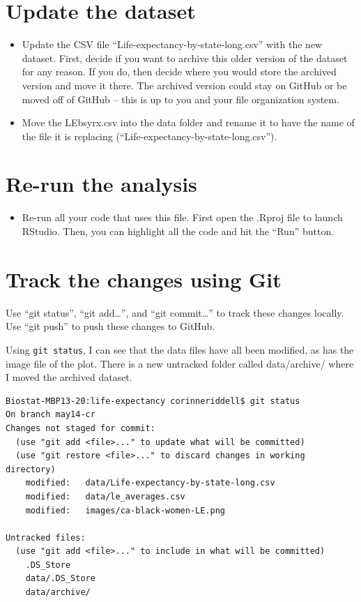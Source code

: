 \documentclass[
]{book}
\providecommand{\tightlist}{%
  \setlength{\itemsep}{0pt}\setlength{\parskip}{0pt}}
\begin{document}
\hypertarget{update-the-dataset}{%
\section{Update the dataset}\label{update-the-dataset}}

\begin{itemize}
\item
  Update the CSV file ``Life-expectancy-by-state-long.csv'' with the new dataset.
  First, decide if you want to archive this older version of the dataset for any reason.
  If you do, then decide where you would store the archived version and move it there.
  The archived version could stay on GitHub or be moved off of GitHub -- this is
  up to you and your file organization system.
\item
  Move the LEbsyrx.csv into the data folder and rename it to have the name of
  the file it is replacing (``Life-expectancy-by-state-long.csv'').
\end{itemize}

\hypertarget{re-run-the-analysis}{%
\section{Re-run the analysis}\label{re-run-the-analysis}}

\begin{itemize}
\tightlist
\item
  Re-run all your code that uses this file. First open the .Rproj file to launch
  RStudio. Then, you can highlight all the code and hit the ``Run'' button.
\end{itemize}

\hypertarget{track-the-changes-using-git}{%
\section{Track the changes using Git}\label{track-the-changes-using-git}}

Use ``git status'', ``git add\ldots{}'', and ``git commit\ldots{}'' to track these changes
locally. Use ``git push'' to push these changes to GitHub.

Using \texttt{git\ status}, I can see that the data files have all been modified, as has
the image file of the plot. There is a new untracked folder called data/archive/
where I moved the archived dataset.

\begin{verbatim}
Biostat-MBP13-20:life-expectancy corinneriddell$ git status
On branch may14-cr
Changes not staged for commit:
  (use "git add <file>..." to update what will be committed)
  (use "git restore <file>..." to discard changes in working directory)
    modified:   data/Life-expectancy-by-state-long.csv
    modified:   data/le_averages.csv
    modified:   images/ca-black-women-LE.png

Untracked files:
  (use "git add <file>..." to include in what will be committed)
    .DS_Store
    data/.DS_Store
    data/archive/
\end{verbatim}
\end{document}
